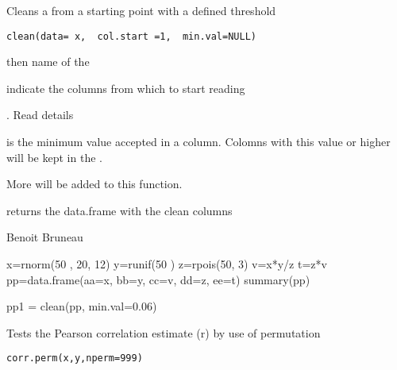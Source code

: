 \documentclass[a4paper]{book}
\begin{document}
\newpage
{}
%
\begin{Description}\relax
Cleans a  from a starting point with a defined threshold
\end{Description}
%
\begin{Usage}
\begin{verbatim}
clean(data= x,  col.start =1,  min.val=NULL)
\end{verbatim}
\end{Usage}
%
\begin{Arguments}
\begin{ldescription}
\item[\code{data}] then name of the 
\item[\code{col.start}] indicate the columns from which to start reading 
\item[\code{min.val}] . Read details
\end{ldescription}
\end{Arguments}
%
\begin{Details}\relax
{} is the minimum value accepted in a column. Colomns with this value or higher will be kept in the .

More will be added to this function.
\end{Details}
%
\begin{Value}
returns the data.frame with the clean columns
\end{Value}
%
\begin{Author}\relax
Benoit Bruneau
\end{Author}
%
\begin{Examples}
\begin{ExampleCode}
x=rnorm(50 , 20,  12)
y=runif(50 )
z=rpois(50,  3)
v=x*y/z
t=z*v
pp=data.frame(aa=x,  bb=y, cc=v,  dd=z,  ee=t)
summary(pp)

pp1 = clean(pp, min.val=0.06)
\end{ExampleCode}
\end{Examples}
\newpage
{}
%
\begin{Description}\relax
Tests the Pearson correlation estimate (r) by use of permutation
\end{Description}
%
\begin{Usage}
\begin{verbatim}
corr.perm(x,y,nperm=999)
\end{verbatim}
\end{Usage}
\end{document}
